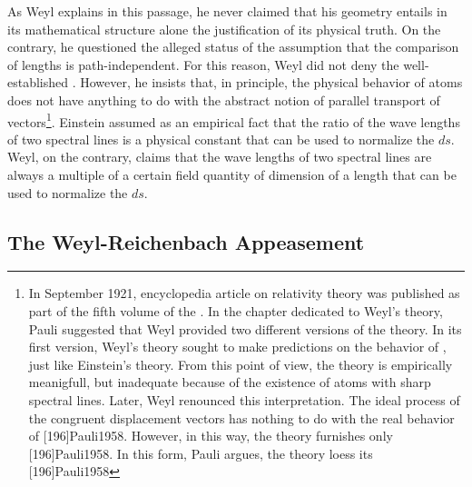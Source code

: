 \documentclass[final]{article}
\newcommand{\WT}{Weyl's theory\xspace}
\begin{document}
As Weyl explains in this passage, he never claimed that his geometry entails in its mathematical structure alone the \apr justification of its physical truth. On the contrary, he questioned the alleged \apr status of the assumption that the comparison of lengths is path-independent. For this reason, Weyl did not deny the well-established . However, he insists that, in principle, the physical behavior of atoms does not have anything to do with the abstract notion of parallel transport of vectors\footnote{\label{pauli}In September 1921,  encyclopedia article on relativity theory was published as part of the fifth volume of the . In the chapter dedicated to \WT, Pauli suggested that Weyl provided two different versions of the theory. In its first version, \WT sought to make predictions on the behavior of \rac, just like Einstein's theory. From this point of view, the theory is empirically meanigfull, but inadequate because of the existence of atoms with sharp spectral lines. Later, Weyl renounced this interpretation. The ideal process of the congruent displacement vectors has nothing to do with the real behavior of \rac {}[196]{Pauli1958}. However, in this way, the theory furnishes only  [196]{Pauli1958}. In this form, Pauli argues, the theory loess its  [196]{Pauli1958}}. Einstein assumed as an empirical fact that the ratio of the wave lengths of two spectral lines is a  physical constant that can be used to normalize the $ds$. Weyl, on the contrary, claims that the wave lengths of two spectral lines are always a multiple of a certain field quantity of dimension of a length that can be used to normalize the $ds$. 

\subsection{The Weyl-Reichenbach Appeasement}

  
\end{document}
